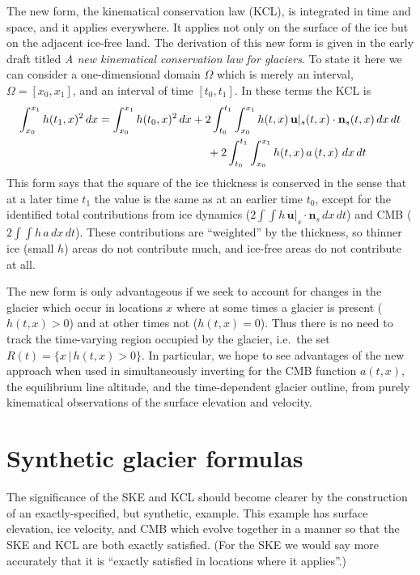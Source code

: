 \documentclass[letterpaper,final,12pt,reqno]{amsart}
\newcommand{\bn}{\mathbf{n}}
\newcommand{\bu}{\mathbf{u}}
\begin{document}
The new form, the kinematical conservation law (KCL), is integrated in time and space, and it applies everywhere.  It applies not only on the surface of the ice but on the adjacent ice-free land.  The derivation of this new form is given in the early draft titled \emph{A new kinematical conservation law for glaciers}.  To state it here we can consider a one-dimensional domain $\Omega$ which is merely an interval, $\Omega=[x_0,x_1]$, and an interval of time $[t_0,t_1]$.  In these terms the KCL is
\begin{align}
\int_{x_0}^{x_1} h(t_1,x)^2\,dx &= \int_{x_0}^{x_1} h(t_0,x)^2\,dx + 2 \int_{t_0}^{t_1} \int_{x_0}^{x_1} h(t,x)\, \bu|_s(t,x)\cdot \bn_s(t,x) \,dx\,dt \label{kcl} \\
  &\hspace{34mm} + 2 \int_{t_0}^{t_1} \int_{x_0}^{x_1} h(t,x)\, a\left(t,x\right) \,dx\,dt \notag
\end{align}
This form says that the square of the ice thickness is conserved in the sense that at a later time $t_1$ the value is the same as at an earlier time $t_0$, except for the identified total contributions from ice dynamics ($2 \int \int h\, \bu|_s \cdot \bn_s \,dx\,dt$) and CMB ($2 \int \int h\, a \,dx\,dt$).  These contributions are ``weighted'' by the thickness, so thinner ice (small $h$) areas do not contribute much, and ice-free areas do not contribute at all.

The new form is only advantageous if we seek to account for changes in the glacier which occur in locations $x$ where at some times a glacier is present ($h(t,x)>0$) and at other times not ($h(t,x)=0$).  Thus there is no need to track the time-varying region occupied by the glacier, i.e.~the set $R(t) = \{x\,|\,h(t,x)>0\}$.  In particular, we hope to see advantages of the new approach when used in simultaneously inverting for the CMB function $a(t,x)$, the equilibrium line altitude, and the time-dependent glacier outline, from purely kinematical observations of the surface elevation and velocity.


\section{Synthetic glacier formulas}

The significance of the SKE and KCL should become clearer by the construction of an exactly-specified, but synthetic, example.  This example has surface elevation, ice velocity, and CMB which evolve together in a manner so that the SKE and KCL are both exactly satisfied.  (For the SKE we would say more accurately that it is ``exactly satisfied in locations where it applies''.)
\end{document}
